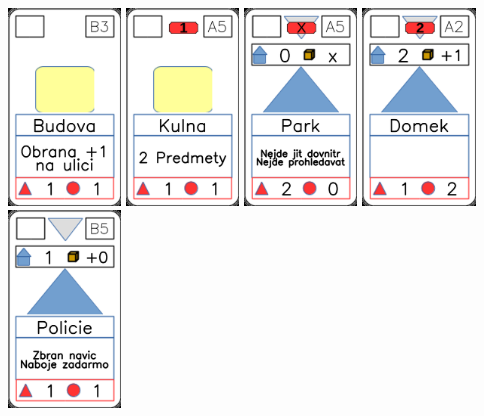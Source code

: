 \documentclass[a4paper]{article}
\begin{document}
	\includegraphics[width=3.0cm]{img-2_7}
	\includegraphics[width=3.0cm]{img-2_19}
	\includegraphics[width=3.0cm]{img-3_19}
	\includegraphics[width=3.0cm]{img-3_1}
	\includegraphics[width=3.0cm]{img-3_9}
\end{document}
